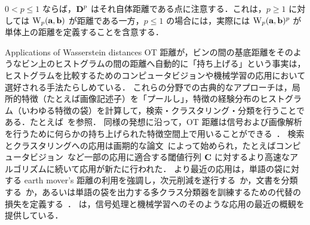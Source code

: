 \begin{rem}
$0 < p \leq 1$ ならば，$\mathrm{\textbf{D}}^p$ はそれ自体距離である点に注意する．これは，$p\geq 1$ に対しては $\operatorname{\mathrm{W}}_p(\mathrm{\textbf{a}},\mathrm{\textbf{b}})$ が距離である一方，$p \leq 1$ の場合には，実際には $\operatorname{\mathrm{W}}_p(\mathrm{\textbf{a}},\mathrm{\textbf{b}})^p$ が単体上の距離を定義することを含意する．
\end{rem}


\begin{rem1}{Applications of Wasserstein distances}
OT 距離が，ビンの間の基底距離をそのようなビン上のヒストグラムの間の距離へ自動的に「持ち上げる」という事実は，ヒストグラムを比較するためのコンピュータビジョンや機械学習の応用において選好される手法たらしめている．
%
これらの分野での古典的なアプローチは，局所的特徴（たとえば画像記述子）を「プールし」，特徴の経験分布のヒストグラム（いわゆる特徴の袋）を計算して，検索・クラスタリング・分類を行うことである．たとえば~\citep{oliva2001modeling}を参照．
%
同様の発想に沿って，OT 距離は信号および画像解析を行うために何らかの持ち上げられた特徴空間上で用いることができる~\citep{thorpe2017transportation}．
%
検索とクラスタリングへの応用は画期的な論文~\citep{RubTomGui00}によって始められ，たとえばコンピュータビジョン~\citep{pele2008linear,Pele-iccv2009}など一部の応用に適合する閾値行列 $\mathrm{\textbf{C}}$ に対するより高速なアルゴリズムに続いて応用が新たに行われた．
%
より最近の応用は，単語の袋に対する earth mover's 距離の利用を強調し，次元削減を遂行する~\citep{pmlr-v51-rolet16}か，文書を分類する~\citep{kusner2015word,huang2016supervised}か，あるいは単語の袋を出力する多クラス分類器を訓練するための代替の損失を定義する~\citep{FrognerNIPS}．
%
\citet{kolouri2017optimal} は，信号処理と機械学習へのそのような応用の最近の概観を提供している．
\end{rem1}





